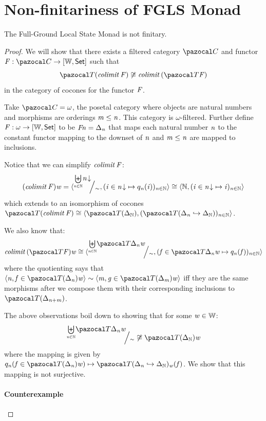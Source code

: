 
\section{Non-finitariness of FGLS Monad}

\begin{theorem} The Full-Ground Local State Monad is not finitary. \end{theorem}
\begin{proof}
We will show that there exists a filtered category $\mcatC$ and functor $\vF : \mcatC \to \funC\worldC\setC$ such that
\[ \monFLS(\colimit\vF) \not\iso \colimit(\monFLS\vF) \]
in the category of cocones for the functor $\mathit{F}$.

Take $\mcatC = \omega$, the posetal category where objects are natural numbers and morphisms are orderings $\mathit{m} \leq \mathit{n}$.
This category is $\omega$-filtered.
Further define $\mathit{F} : \omega \to [\mathbb{W}, \mathsf{Set}]$ to be $\mathit{F}\mathit{n} = \Delta_{\mathit{n}}$ that maps each natural number $\mathit{n}$ to the constant functor mapping to the downset of $\mathit{n}$ and $\mathit{m} \leq \mathit{n}$ are mapped to inclusions.

Notice that we can simplify $\mathit{colimit}\,{\mathit{F}}$:
\[ (\colimit\vF)\vw = \tup{\quotient{\disunion{\vn \in \nat}\downset\vn}\sim}{\tlistr{\vi \in \downset\vn \mapsto \quot\vn(\vi)}{\vn \in \nat}} 
                    \iso \tup\nat{\tlistr{\vi \in \downset\vn \mapsto \vi}{\vn \in \nat}} \]
which extends to an isomorphism of cocones $\monFLS(\colimit\vF) \iso \tup{\monFLS(\Delta_\nat)}{\tlistr{\monFLS(\Delta_\vn \inclto \Delta_\nat)}{\vn \in \nat}}$.

We also know that:
\[ \colimit(\monFLS\vF)\vw \iso \tup{\quotient{\disunion{\vn \in \nat} \monFLS{\Delta_\vn}\vw}\sim}
                                    {\tlistr{\vf \in \monFLS\Delta_\vn\vw \mapsto \quot\vn(\vf)}{\vn \in \nat}} \]
where the quotienting says that $\tup\vn{\vf \in \monFLS(\Delta_\vn)\vw} \sim \tup\vm{\vg \in \monFLS(\Delta_\vm)\vw}$ iff they are the same morphisms after we compose them with their corresponding inclusions to $\monFLS(\Delta_{\vn + \vm})$.

The above observations boil down to showing that for some $\mathit{w} \in \mathbb{W}$:
\[ \quotient{\disunion{\vn \in \nat} \monFLS{\Delta_\vn}\vw}\sim \not\iso \monFLS(\Delta_\nat)\vw \]
where the mapping is given by $\quot\vn(\vf \in \monFLS(\Delta_\vn)\vw) \mapsto \monFLS(\Delta_\vn \inclto \Delta_\nat)_\vw(\vf)$.
We show that this mapping is not surjective.

\paragraph{Counterexample}


\end{proof}
